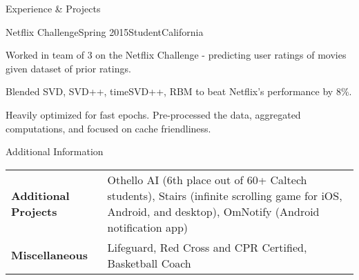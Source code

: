 \documentclass{resume} %
\begin{document}
\begin{rSection}{Experience \& Projects}

\begin{rSubsection}{Netflix Challenge}{Spring 2015}{Student}{California}
\item Worked in team of 3 on the Netflix Challenge - predicting user ratings of movies given dataset of prior ratings.
\item Blended SVD, SVD++, timeSVD++, RBM to beat Netflix's performance by  8\%.
\item Heavily optimized for fast epochs. Pre-processed the data, aggregated
    computations, and focused on cache friendliness.
\end{rSubsection}


\end{rSection}




\begin{rSection}{Additional Information}

\noindent\begin{tabularx}{.98\textwidth}{@{}lX}
    \bfseries{Additional Projects}   &  Othello AI (6th place out of 60+ Caltech
    students), Stairs (infinite scrolling game for iOS, Android, and desktop),
    OmNotify (Android notification app) \\
    \bfseries{Miscellaneous}   &  Lifeguard, Red Cross and CPR Certified, Basketball
    Coach \\
\end{tabularx}

\end{rSection}
\end{document}
